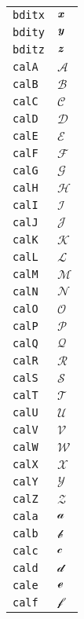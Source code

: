 \begin{longtable}{ll}
\texttt{bditx}&${}\textbf{\textit{x}}{}$\\
\texttt{bdity}&${}\textbf{\textit{y}}{}$\\
\texttt{bditz}&${}\textbf{\textit{z}}{}$\\
\texttt{calA}&${}\mathcal{A}{}$\\
\texttt{calB}&${}\mathcal{B}{}$\\
\texttt{calC}&${}\mathcal{C}{}$\\
\texttt{calD}&${}\mathcal{D}{}$\\
\texttt{calE}&${}\mathcal{E}{}$\\
\texttt{calF}&${}\mathcal{F}{}$\\
\texttt{calG}&${}\mathcal{G}{}$\\
\texttt{calH}&${}\mathcal{H}{}$\\
\texttt{calI}&${}\mathcal{I}{}$\\
\texttt{calJ}&${}\mathcal{J}{}$\\
\texttt{calK}&${}\mathcal{K}{}$\\
\texttt{calL}&${}\mathcal{L}{}$\\
\texttt{calM}&${}\mathcal{M}{}$\\
\texttt{calN}&${}\mathcal{N}{}$\\
\texttt{calO}&${}\mathcal{O}{}$\\
\texttt{calP}&${}\mathcal{P}{}$\\
\texttt{calQ}&${}\mathcal{Q}{}$\\
\texttt{calR}&${}\mathcal{R}{}$\\
\texttt{calS}&${}\mathcal{S}{}$\\
\texttt{calT}&${}\mathcal{T}{}$\\
\texttt{calU}&${}\mathcal{U}{}$\\
\texttt{calV}&${}\mathcal{V}{}$\\
\texttt{calW}&${}\mathcal{W}{}$\\
\texttt{calX}&${}\mathcal{X}{}$\\
\texttt{calY}&${}\mathcal{Y}{}$\\
\texttt{calZ}&${}\mathcal{Z}{}$\\
\texttt{cala}&${}\mathcal{a}{}$\\
\texttt{calb}&${}\mathcal{b}{}$\\
\texttt{calc}&${}\mathcal{c}{}$\\
\texttt{cald}&${}\mathcal{d}{}$\\
\texttt{cale}&${}\mathcal{e}{}$\\
\texttt{calf}&${}\mathcal{f}{}$\\

\end{longtable}
